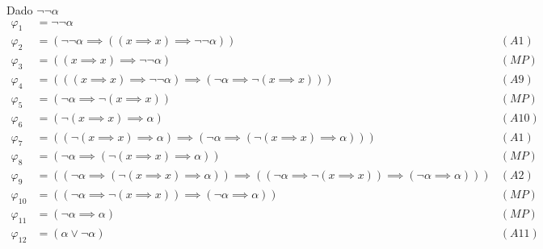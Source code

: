 \begin{sol}
    Dado $\neg\neg\alpha$
    \begin{align*}
        \varphi_1    & = \neg\neg\alpha                                                                                                                                 \\
        \varphi_2    & = (\neg\neg\alpha\implies((x\implies x)\implies \neg\neg\alpha))                                                                           & (A1)  \\
        \varphi_3    & = ((x\implies x)\implies\neg\neg\alpha)                                                                                                    & (MP)  \\
        \varphi_4    & = (((x\implies x)\implies\neg\neg\alpha)\implies(\neg\alpha\implies\neg(x\implies x)))                                                     & (A9)  \\
        \varphi_5    & = (\neg\alpha\implies\neg(x\implies x))                                                                                                    & (MP)  \\
        \varphi_6    & = (\neg(x\implies x)\implies\alpha)                                                                                                        & (A10) \\
        \varphi_7    & = ((\neg(x\implies x)\implies\alpha)\implies(\neg\alpha\implies(\neg(x\implies x)\implies\alpha)))                                         & (A1)  \\
        \varphi_8    & = (\neg\alpha\implies(\neg(x\implies x)\implies\alpha))                                                                                    & (MP)  \\
        \varphi_9    & = ((\neg\alpha\implies(\neg(x\implies x)\implies\alpha))\implies((\neg\alpha\implies\neg(x\implies x))\implies(\neg\alpha\implies\alpha))) & (A2)  \\
        \varphi_{10} & = ((\neg\alpha\implies\neg(x\implies x))\implies(\neg\alpha\implies\alpha))                                                                & (MP)  \\
        \varphi_{11} & = (\neg\alpha\implies\alpha)                                                                                                               & (MP)  \\
        \varphi_{12} & = (\alpha\vee\neg\alpha)                                                                                                                   & (A11) \\

\end{align*}
\end{sol}
